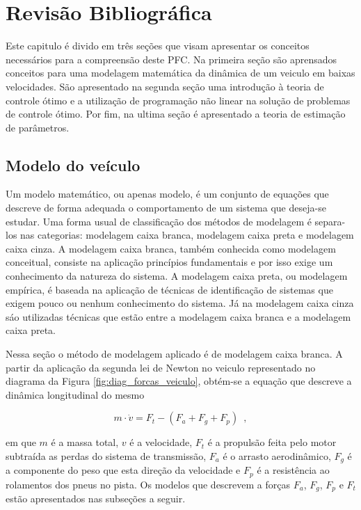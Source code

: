 \chapter[Revisão Bibliográfica]{Revisão Bibliográfica}
\label{chap:revisao_bibliografica}
\thispagestyle{empty}

Este capitulo é divido em três seções que visam apresentar os conceitos necessários para a compreensão deste PFC.
Na primeira seção são aprensados conceitos para uma modelagem matemática da dinâmica de um veiculo em baixas velocidades.
São apresentado na segunda seção uma introdução à teoria de controle ótimo e a utilização de programação não linear na solução
de problemas de controle ótimo. Por fim, na ultima seção é apresentado a teoria de estimação de parâmetros.

\section{Modelo do veículo}
\label{sec:modelo}

Um modelo matemático, ou apenas modelo, é um conjunto de equações que descreve de forma adequada o comportamento de um sistema que deseja-se estudar.
Uma forma usual de classificação dos métodos de modelagem é separa-los nas categorias: modelagem caixa branca, modelagem caixa preta e modelagem
caixa cinza.
A modelagem caixa branca, também conhecida como modelagem conceitual, consiste na aplicação princípios fundamentais e por isso exige um conhecimento
da natureza do sistema.
A modelagem caixa preta, ou modelagem empírica, é baseada na aplicação de técnicas de identificação de sistemas que exigem pouco ou
nenhum conhecimento do sistema.
Já na modelagem caixa cinza sáo utilizadas técnicas que estão entre a modelagem caixa branca e a modelagem caixa preta\cite{book:Aguirre}.

Nessa seção o método de modelagem aplicado é de modelagem caixa branca. A partir da aplicação da segunda lei de Newton no
veiculo representado no diagrama da Figura \ref{fig:diag_forcas_veiculo}, obtém-se a equação que descreve a dinâmica longitudinal do mesmo

\begin{equation}
	\label{eq:SomaForcas}
	m \cdot \dot v	= F_t - (F_a +	F_g + F_p)
	\enspace,
\end{equation}

em que $m$ é a massa total, $v$ é a velocidade, $F_{t}$ é a propulsão feita pelo motor subtraída as perdas do sistema de transmissão, $F_{a}$ é o
arrasto aerodinâmico, $F_g$ é a componente do peso que esta direção da velocidade e $F_{p}$ é a resistência ao rolamentos dos pneus no pista.
Os modelos que descrevem a forças $F_{a}$, $F_g$, $F_{p}$ e $F_{t}$ estão apresentados nas subseções a seguir.

